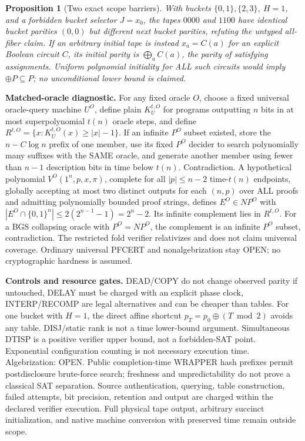 \documentclass[11pt]{article}
\newtheorem{proposition}[theorem]{Proposition}
\begin{document}
\begin{proposition}[Two exact scope barriers]
With buckets $\{0,1\},\{2,3\}$, $H=1$, and a forbidden bucket selector $J=x_0$, the tapes $0000$ and $1100$ have identical bucket parities $(0,0)$ but different next bucket parities, refuting the untyped all-fiber claim. If an arbitrary initial tape is instead $x_a=C(a)$ for an explicit Boolean circuit $C$, its initial parity is $\bigoplus_a C(a)$, the parity of satisfying assignments. Uniform polynomial initiality for ALL such circuits would imply $\oplus P\subseteq P$; no unconditional lower bound is claimed.
\end{proposition}

\noindent\textbf{Matched-oracle diagnostic.} For any fixed oracle $O$, choose a fixed universal oracle-query machine $U^O$, define plain $K_U^{t,O}$ for programs outputting $n$ bits in at most superpolynomial $t(n)$ oracle steps, and define $R^{t,O}=\{x:K_U^{t,O}(x)\ge |x|-1\}$. If an infinite $P^O$ subset existed, store the $n-C\log n$ prefix of one member, use its fixed $P^O$ decider to search polynomially many suffixes with the SAME oracle, and generate another member using fewer than $n-1$ description bits in time below $t(n)$. Contradiction. A hypothetical polynomial $V^O(1^n,p,x,\pi)$, complete for all $|p|\le n-2$ time-$t(n)$ endpoints, globally accepting at most two distinct outputs for each $(n,p)$ over ALL proofs and admitting polynomially bounded proof strings, defines $E^O\in NP^O$ with $|E^O\cap\{0,1\}^n|\le 2(2^{n-1}-1)=2^n-2$. Its infinite complement lies in $R^{t,O}$. For a BGS collapsing oracle with $P^O=NP^O$, the complement is an infinite $P^O$ subset, contradiction. The restricted fold verifier relativizes and does not claim universal coverage. Ordinary universal PFCERT and nonalgebrization stay OPEN; no cryptographic hardness is assumed.

\noindent\textbf{Controls and resource gates.} DEAD/COPY do not change observed parity if untouched, DELAY must be charged with an explicit phase clock, INTERP/RECOMP are legal alternatives and can be cheaper than tables. For one bucket with $H=1$, the direct affine shortcut $p_T=p_0\oplus(T\bmod2)$ avoids any table. DISJ/static rank is not a time lower-bound argument. Simultaneous DTISP is a positive verifier upper bound, not a forbidden-SAT point. Exponential configuration counting is not necessary execution time. Algebrization: OPEN. Public completion-time WRAPPER hash prefixes permit postdisclosure brute-force search; freshness and unpredictability do not prove a classical SAT separation. Source authentication, querying, table construction, failed attempts, bit precision, retention and output are charged within the declared verifier execution. Full physical tape output, arbitrary succinct initialization, and native machine conversion with preserved time remain outside scope.
\end{document}
